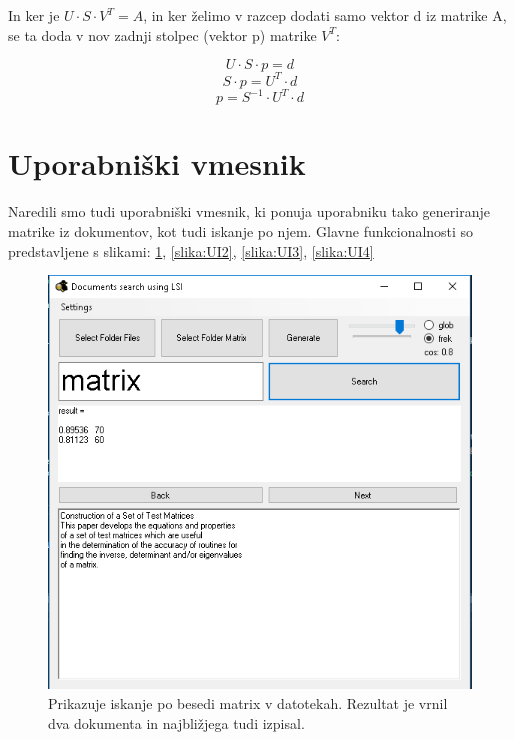 \documentclass{article}
\begin{document}
In ker je \( U \cdot S \cdot V^{T} = A \), in ker želimo v razcep dodati samo vektor d iz matrike A, se ta doda v nov zadnji stolpec (vektor p) matrike \(  V^{T} \):

\[ 
U \cdot S \cdot p = d \]
\[ S \cdot p = U^{T} \cdot d   \]
\[ p = S^{-1} \cdot  U^{T} \cdot d  \]

\section{Uporabniški vmesnik}
Naredili smo tudi uporabniški vmesnik, ki ponuja uporabniku tako generiranje matrike iz dokumentov, kot tudi iskanje po njem. Glavne funkcionalnosti so predstavljene s slikami:  \ref{slika:UI1}, \ref{slika:UI2}, \ref{slika:UI3}, \ref{slika:UI4}

\begin{figure}[h]
 \centering
    \includegraphics[width=\linewidth]{UI001}
    \caption{Prikazuje iskanje po besedi matrix v datotekah. Rezultat je vrnil dva dokumenta in najbližjega tudi izpisal. }
    \label{slika:UI1}
\end{figure}
\end{document}
